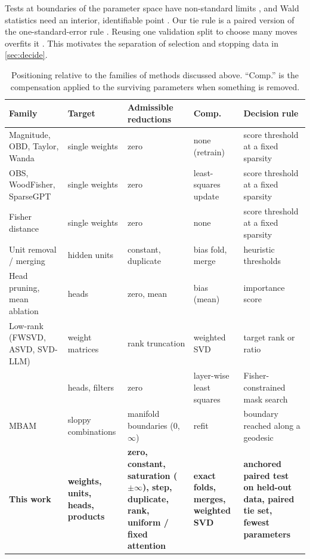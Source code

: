 \documentclass[11pt,a4paper]{article}
\theoremstyle{definition}
\begin{document}
Tests at boundaries of the parameter space have non-standard limits
\citep{chernoff1954distribution,self1987asymptotic}, and Wald statistics need an
interior, identifiable point \citep{wald1943tests}. Our tie rule is a paired version
of the one-standard-error rule \citep{breiman1984classification,hastie2009elements}.
Reusing one validation split to choose many moves overfits it
\citep{cawley2010overfitting,dwork2015reusable}. This motivates the separation of
selection and stopping data in \cref{sec:decide}.

\begin{table}[t]
\centering\footnotesize
\caption{Positioning relative to the families of methods discussed above. ``Comp.''
is the compensation applied to the surviving parameters when something is removed.}
\label{tab:related}
\renewcommand{\arraystretch}{1.25}
\begin{tabularx}{\textwidth}{@{}p{2.7cm}XXp{2.3cm}X@{}}
\toprule
\textbf{Family} & \textbf{Target} & \textbf{Admissible reductions} & \textbf{Comp.} & \textbf{Decision rule}\\
\midrule
Magnitude, OBD, Taylor, Wanda & single weights & zero & none (retrain) & score threshold at a fixed sparsity\\
OBS, WoodFisher, SparseGPT & single weights & zero & least-squares update & score threshold at a fixed sparsity\\
Fisher distance \citep{berman2026fdist} & single weights & zero & none & score threshold at a fixed sparsity\\
Unit removal / merging & hidden units & constant, duplicate & bias fold, merge & heuristic thresholds\\
Head pruning, mean ablation & heads & zero, mean & bias (mean) & importance score\\
Low-rank (FWSVD, ASVD, SVD-LLM) & weight matrices & rank truncation & weighted SVD & target rank or ratio\\
\citet{kwon2022fast} & heads, filters & zero & layer-wise least squares & Fisher-constrained mask search\\
MBAM & sloppy combinations & manifold boundaries ($0$, $\infty$) & refit & boundary reached along a geodesic\\
\midrule
\textbf{This work} & \textbf{weights, units, heads, products} & \textbf{zero, constant, saturation ($\pm\infty$), step, duplicate, rank, uniform / fixed attention} & \textbf{exact folds, merges, weighted SVD} & \textbf{anchored paired test on held-out data, paired tie set, fewest parameters}\\
\bottomrule
\end{tabularx}
\end{table}
\end{document}
